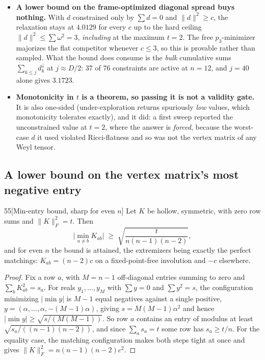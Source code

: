 \begin{itemize}[leftmargin=1.5em,nosep]
\item \textbf{A lower bound on the frame-optimized diagonal spread buys nothing.} With $d$ constrained only by $\sum d=0$ and $\|d\|^2\ge c$, the relaxation stays at $4.0129$ for every $c$ up to the hard ceiling $\|d\|^2\le\sum\omega^2=3$, \emph{including} at the maximum $t=2$. The free $p_3$-minimizer majorizes the flat competitor whenever $c\le3$, so this is provable rather than sampled. What the bound does consume is the \emph{bulk} cumulative sums $\sum_{k\le j}d^{\downarrow}_k$ at $j\approx D/2$: $37$ of $76$ constraints are active at $n=12$, and $j=40$ alone gives $3.1723$.
\item \textbf{Monotonicity in $t$ is a theorem, so passing it is not a validity gate.} It is also one-sided (under-exploration returns spuriously \emph{low} values, which monotonicity tolerates exactly), and it did: a first sweep reported the unconstrained value at $t=2$, where the answer is \emph{forced}, because the worst-case $d$ it used violated Ricci-flatness and so was not the vertex matrix of any Weyl tensor.
\end{itemize}

\subsection{A lower bound on the vertex matrix's most negative entry}\label{sec:minentry}

\begin{Lem}{55}[Min-entry bound, sharp for even $n$]
Let $K$ be hollow, symmetric, with zero row sums and $\|K\|_F^2=t$. Then
\[
\Big|\min_{a\ne b}K_{ab}\Big|\;\ge\;\sqrt{\frac t{n(n-1)(n-2)}},
\]
and for even $n$ the bound is attained, the extremizers being exactly the perfect matchings: $K_{ab}=(n-2)c$ on a fixed-point-free involution and $-c$ elsewhere.
\end{Lem}

\begin{proof}
Fix a row $a$, with $M=n-1$ off-diagonal entries summing to zero and $\sum_bK_{ab}^2=s_a$. For reals $y_1,\dots,y_M$ with $\sum y=0$ and $\sum y^2=s$, the configuration minimizing $|\min y|$ is $M-1$ equal negatives against a single positive, $y=(\alpha,\dots,\alpha,-(M-1)\alpha)$, giving $s=M(M-1)\alpha^2$ and hence $|\min y|\ge\sqrt{s/(M(M-1))}$. So row $a$ contains an entry of modulus at least $\sqrt{s_a/((n-1)(n-2))}$, and since $\sum_as_a=t$ some row has $s_a\ge t/n$. For the equality case, the matching configuration makes both steps tight at once and gives $\|K\|_F^2=n(n-1)(n-2)c^2$.
\end{proof}

